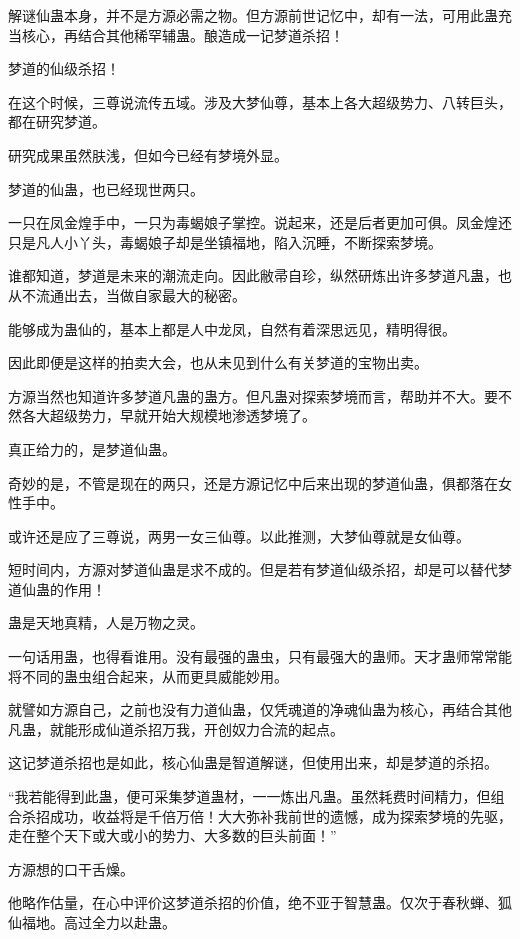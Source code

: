 \begin{this_body}
解谜仙蛊本身，并不是方源必需之物。但方源前世记忆中，却有一法，可用此蛊充当核心，再结合其他稀罕辅蛊。酿造成一记梦道杀招！

梦道的仙级杀招！

在这个时候，三尊说流传五域。涉及大梦仙尊，基本上各大超级势力、八转巨头，都在研究梦道。

研究成果虽然肤浅，但如今已经有梦境外显。

梦道的仙蛊，也已经现世两只。

一只在凤金煌手中，一只为毒蝎娘子掌控。说起来，还是后者更加可俱。凤金煌还只是凡人小丫头，毒蝎娘子却是坐镇福地，陷入沉睡，不断探索梦境。

谁都知道，梦道是未来的潮流走向。因此敝帚自珍，纵然研炼出许多梦道凡蛊，也从不流通出去，当做自家最大的秘密。

能够成为蛊仙的，基本上都是人中龙凤，自然有着深思远见，精明得很。

因此即便是这样的拍卖大会，也从未见到什么有关梦道的宝物出卖。

方源当然也知道许多梦道凡蛊的蛊方。但凡蛊对探索梦境而言，帮助并不大。要不然各大超级势力，早就开始大规模地渗透梦境了。

真正给力的，是梦道仙蛊。

奇妙的是，不管是现在的两只，还是方源记忆中后来出现的梦道仙蛊，俱都落在女性手中。

或许还是应了三尊说，两男一女三仙尊。以此推测，大梦仙尊就是女仙尊。

短时间内，方源对梦道仙蛊是求不成的。但是若有梦道仙级杀招，却是可以替代梦道仙蛊的作用！

蛊是天地真精，人是万物之灵。

一句话用蛊，也得看谁用。没有最强的蛊虫，只有最强大的蛊师。天才蛊师常常能将不同的蛊虫组合起来，从而更具威能妙用。

就譬如方源自己，之前也没有力道仙蛊，仅凭魂道的净魂仙蛊为核心，再结合其他凡蛊，就能形成仙道杀招万我，开创奴力合流的起点。

这记梦道杀招也是如此，核心仙蛊是智道解谜，但使用出来，却是梦道的杀招。

“我若能得到此蛊，便可采集梦道蛊材，一一炼出凡蛊。虽然耗费时间精力，但组合杀招成功，收益将是千倍万倍！大大弥补我前世的遗憾，成为探索梦境的先驱，走在整个天下或大或小的势力、大多数的巨头前面！”

方源想的口干舌燥。

他略作估量，在心中评价这梦道杀招的价值，绝不亚于智慧蛊。仅次于春秋蝉、狐仙福地。高过全力以赴蛊。


\end{this_body}
